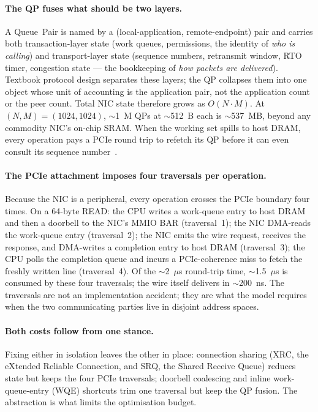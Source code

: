 \documentclass[10pt,twocolumn]{article}
\begin{document}
\paragraph{The QP fuses what should be two layers.} A Queue~Pair
is named by a (local-application, remote-endpoint) pair and
carries both transaction-layer state (work queues, permissions,
the identity of \emph{who is calling}) and transport-layer state
(sequence numbers, retransmit window, RTO timer, congestion state
--- the bookkeeping of \emph{how packets are delivered}). Textbook
protocol design separates these layers; the QP collapses them into
one object whose unit of accounting is the application pair, not
the application count or the peer count. Total NIC state therefore
grows as $O(N{\cdot}M)$. At $(N,M){=}(1024,1024)$, $\sim$1~M QPs
at $\sim$512~B each is $\sim$537~MB, beyond any commodity NIC's
on-chip SRAM. When the working set spills to host DRAM, every
operation pays a PCIe round trip to refetch its QP before it can
even consult its sequence
number~\cite{kong2022:collie,wang2023:srnic}.

\paragraph{The PCIe attachment imposes four traversals per
operation.} Because the NIC is a peripheral, every operation
crosses the PCIe boundary four times. On a 64-byte READ: the CPU
writes a work-queue entry to host DRAM and then a doorbell to the
NIC's MMIO BAR (traversal~1); the NIC DMA-reads the work-queue
entry (traversal~2); the NIC emits the wire request, receives the
response, and DMA-writes a completion entry to host DRAM
(traversal~3); the CPU polls the completion queue and incurs a
PCIe-coherence miss to fetch the freshly written line
(traversal~4). Of the $\sim$2~$\mu$s round-trip time,
$\sim$1.5~$\mu$s is consumed by these four traversals; the wire
itself delivers in $\sim$200~ns. The traversals are not an
implementation accident; they are what the model requires when the
two communicating parties live in disjoint address spaces.

\paragraph{Both costs follow from one stance.}
Fixing either in isolation leaves the other in place: connection
sharing (XRC, the eXtended Reliable Connection, and SRQ, the
Shared Receive Queue) reduces state but keeps the four PCIe
traversals; doorbell coalescing and inline work-queue-entry (WQE)
shortcuts trim one traversal but keep the QP fusion. The abstraction is what limits
the optimisation budget.
\end{document}
